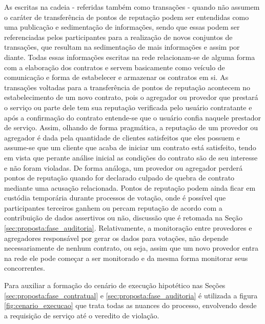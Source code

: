%
As escritas na cadeia - referidas também como transações - quando não assumem o caráter de transferência de pontos de reputação podem ser entendidas como uma publicação e sedimentação de informações, sendo que essas podem ser referenciadas pelos participantes para a realização de novos conjuntos de transações, que resultam na sedimentação de mais informações e assim por diante. Todas essas informações escritas na rede relacionam-se de alguma forma com a elaboração dos contratos e servem basicamente como veículo de comunicação e forma de estabelecer e armazenar os contratos em si. 
%
As transações voltadas para a transferência de pontos de reputação acontecem no estabelecimento de um novo contrato, pois o agregador ou provedor que prestará o serviço ou parte dele tem sua reputação verificada pelo usuário contratante e após a confirmação do contrato entende-se que o usuário confia naquele prestador de serviço. Assim, olhando de forma pragmática, a reputação de um provedor ou agregador é dada pela quantidade de clientes satisfeitos que eles possuem e assume-se que um cliente que acaba de iniciar um contrato está satisfeito, tendo em vista que perante análise inicial as condições do contrato são de seu interesse e não foram violadas.
%
De forma análoga, um provedor ou agregador perderá pontos de reputação quando for declarado culpado de quebra de contrato mediante uma acusação relacionada. Pontos de reputação podem ainda ficar em custódia temporária durante processos de votação, onde é possível que participantes terceiros ganhem ou percam reputação de acordo com a contribuição de dados assertivos ou não, discussão que é retomada na Seção \ref{sec:proposta:fase_auditoria}. 
%
Relativamente, a monitoração entre provedores e agregadores responsável por gerar os dados para votações, não depende necessariamente de nenhum contrato, ou seja, assim que um novo provedor entra na rede ele pode começar a ser monitorado e da mesma forma monitorar seus concorrentes.

%
Para auxiliar a formação do cenário de execução hipotético nas Seções \ref{sec:proposta:fase_contratual} e \ref{sec:proposta:fase_auditoria} é utilizada a figura \ref{fig:cenario_execucao} que trata todas as nuances do processo, envolvendo desde a requisição de serviço até o veredito de violação.

